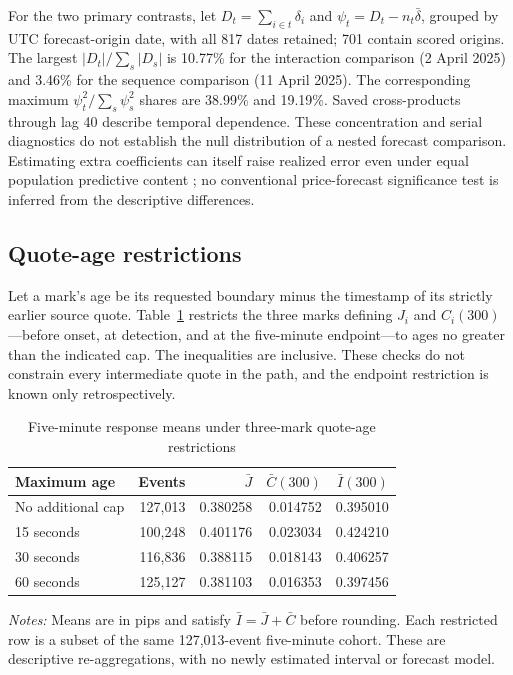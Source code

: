 \documentclass[12pt,letterpaper]{article}
\begin{document}
For the two primary contrasts, let $D_t=\sum_{i\in t}\delta_i$ and $\psi_t=D_t-n_t\bar\delta$, grouped by UTC forecast-origin date, with all 817 dates retained; 701 contain scored origins. The largest $|D_t|/\sum_s|D_s|$ is 10.77\% for the interaction comparison (2 April 2025) and 3.46\% for the sequence comparison (11 April 2025). The corresponding maximum $\psi_t^2/\sum_s\psi_s^2$ shares are 38.99\% and 19.19\%. Saved cross-products through lag 40 describe temporal dependence. These concentration and serial diagnostics do not establish the null distribution of a nested forecast comparison. Estimating extra coefficients can itself raise realized error even under equal population predictive content \citep{clark2007approximately}; no conventional price-forecast significance test is inferred from the descriptive differences.

\subsection{Quote-age restrictions}
\label{app:quoteage}

Let a mark's age be its requested boundary minus the timestamp of its strictly earlier source quote. Table~\ref{tab:quoteage} restricts the three marks defining $J_i$ and $C_i(300)$---before onset, at detection, and at the five-minute endpoint---to ages no greater than the indicated cap. The inequalities are inclusive. These checks do not constrain every intermediate quote in the path, and the endpoint restriction is known only retrospectively.

\begin{table}[htbp]
\centering
\caption{Five-minute response means under three-mark quote-age restrictions}
\label{tab:quoteage}
\begin{tabular}{lrrrr}
\toprule
Maximum age & Events & $\bar J$ & $\bar C(300)$ & $\bar I(300)$\\
\midrule
No additional cap & 127,013 & 0.380258 & 0.014752 & 0.395010\\
15 seconds & 100,248 & 0.401176 & 0.023034 & 0.424210\\
30 seconds & 116,836 & 0.388115 & 0.018143 & 0.406257\\
60 seconds & 125,127 & 0.381103 & 0.016353 & 0.397456\\
\bottomrule
\end{tabular}
\begin{minipage}{0.98\linewidth}\small
\emph{Notes:} Means are in pips and satisfy $\bar I=\bar J+\bar C$ before rounding. Each restricted row is a subset of the same 127,013-event five-minute cohort. These are descriptive re-aggregations, with no newly estimated interval or forecast model.
\end{minipage}
\end{table}
\end{document}
